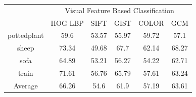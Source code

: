 \begin{table}[!ht]
  \begin{tabular}{| c | c | c | c | c | c |}
\hline
 {\multirow{2}{*}{Labels}} & \multicolumn{5}{|c|}{Visual Feature Based Classification} \\ 
 \cline{2-6}
  & HOG-LBP & SIFT & GIST & COLOR & GCM \\  [1ex] \hline
pottedplant & 59.6 & 53.57 & 55.97 & 59.72 & 57.1 \\  [1ex] \hline
sheep & 73.34 & 49.68 & 67.7 & 62.14 & 68.27 \\  [1ex] \hline
sofa & 64.89 & 53.21 & 56.27 & 54.22 & 62.71 \\  [1ex] \hline
train & 71.61 & 56.76 & 65.79 & 57.61 & 63.24 \\  [1ex] \hline
Average & 66.26 & 54.6 & 61.9 & 57.19 & 63.61 \\  [1ex] \hline
\end{tabular}
\label{PASCALPrecisionVisual} %
\end{table}

